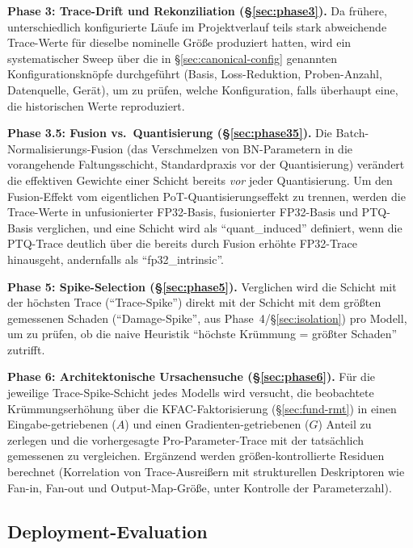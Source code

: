 \textbf{Phase 3: Trace-Drift und Rekonziliation (\S\ref{sec:phase3}).} Da frühere, unterschiedlich konfigurierte Läufe im Projektverlauf teils stark abweichende Trace-Werte für dieselbe nominelle Größe produziert hatten, wird ein systematischer Sweep über die in \S\ref{sec:canonical-config} genannten Konfigurationsknöpfe durchgeführt (Basis, Loss-Reduktion, Proben-Anzahl, Datenquelle, Gerät), um zu prüfen, welche Konfiguration, falls überhaupt eine, die historischen Werte reproduziert.
\par\medskip

\textbf{Phase 3.5: Fusion vs.\ Quantisierung (\S\ref{sec:phase35}).} Die Batch-Normalisierungs-Fusion (das Verschmelzen von BN-Parametern in die vorangehende Faltungsschicht, Standardpraxis vor der Quantisierung) verändert die effektiven Gewichte einer Schicht bereits \emph{vor} jeder Quantisierung. Um den Fusion-Effekt vom eigentlichen PoT-Quantisierungseffekt zu trennen, werden die Trace-Werte in unfusionierter FP32-Basis, fusionierter FP32-Basis und PTQ-Basis verglichen, und eine Schicht wird als \enquote{quant\_induced} definiert, wenn die PTQ-Trace deutlich über die bereits durch Fusion erhöhte FP32-Trace hinausgeht, andernfalls als \enquote{fp32\_intrinsic}.
\par\medskip

\textbf{Phase 5: Spike-Selection (\S\ref{sec:phase5}).} Verglichen wird die Schicht mit der höchsten Trace (\enquote{Trace-Spike}) direkt mit der Schicht mit dem größten gemessenen Schaden (\enquote{Damage-Spike}, aus Phase~4/\S\ref{sec:isolation}) pro Modell, um zu prüfen, ob die naive Heuristik \enquote{höchste Krümmung = größter Schaden} zutrifft.
\par\medskip

\textbf{Phase 6: Architektonische Ursachensuche (\S\ref{sec:phase6}).} Für die jeweilige Trace-Spike-Schicht jedes Modells wird versucht, die beobachtete Krümmungserhöhung über die KFAC-Faktorisierung (\S\ref{sec:fund-rmt}) in einen Eingabe-getriebenen ($A$) und einen Gradienten-getriebenen ($G$) Anteil zu zerlegen und die vorhergesagte Pro-Parameter-Trace mit der tatsächlich gemessenen zu vergleichen. Ergänzend werden größen-kontrollierte Residuen berechnet (Korrelation von Trace-Ausreißern mit strukturellen Deskriptoren wie Fan-in, Fan-out und Output-Map-Größe, unter Kontrolle der Parameterzahl).

\subsection{Deployment-Evaluation}
\label{sec:deployment-method}

